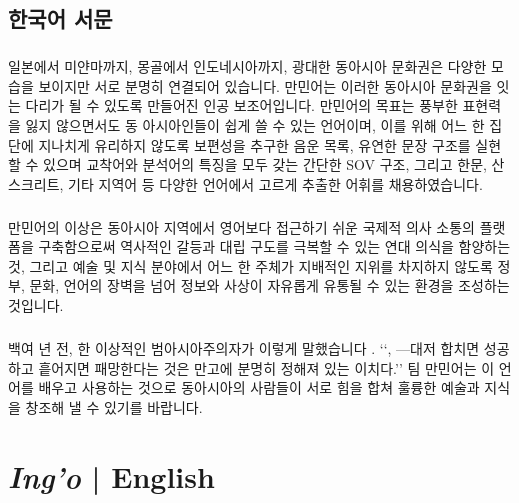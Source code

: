 \documentclass{book}
\begin{document}
    \section{한국어 서문} 
        \paragraph{}
        일본에서 미얀마까지, 몽골에서 인도네시아까지, 광대한 동아시아 문화권은 다양한 모습을 보이지만 서로 분명히 연결되어 있습니다. 만민어는 이러한 동아시아 문화권을 잇는 다리가 될 수 있도록 만들어진 인공 보조어입니다. 만민어의 목표는 풍부한 표현력을 잃지 않으면서도 동 아시아인들이 쉽게 쓸 수 있는 언어이며, 이를 위해 어느 한 집단에 지나치게 유리하지 않도록 보편성을 추구한 음운 목록, 유연한 문장 구조를 실현할 수 있으며 교착어와 분석어의 특징을 모두 갖는 간단한 SOV 구조, 그리고 한문, 산스크리트, 기타 지역어 등 다양한 언어에서 고르게 추출한 어휘를 채용하였습니다.
        \paragraph{}
        만민어의 이상은 동아시아 지역에서 영어보다 접근하기 쉬운 국제적 의사 소통의 플랫폼을 구축함으로써 역사적인 갈등과 대립 구도를 극복할 수 있는 연대 의식을 함양하는 것, 그리고 예술 및 지식 분야에서 어느 한 주체가 지배적인 지위를 차지하지 않도록 정부, 문화, 언어의 장벽을 넘어 정보와 사상이 자유롭게 유통될 수 있는 환경을 조성하는 것입니다.
        \paragraph{}
        백여 년 전, 한 이상적인 범아시아주의자가 이렇게 말했습니다 . \lq\lq {},  —대저 합치면 성공하고 흩어지면 패망한다는 것은 만고에 분명히 정해져 있는 이치다.\rq\rq
        팀 만민어는 이 언어를 배우고 사용하는 것으로 동아시아의 사람들이 서로 힘을 합쳐 훌륭한 예술과 지식을 창조해 낼 수 있기를 바랍니다.
        
        
        
        
        
        
        
        
        
        
        
        
        \tableofcontents{}  
        \mainmatter 
\chapter{\textit{Ing'o} | English}
\end{document}
